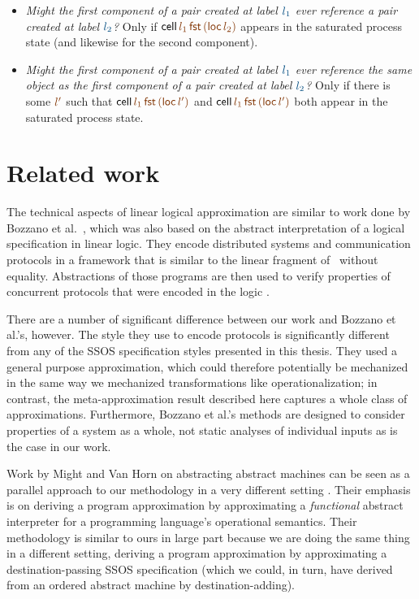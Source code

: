 \smallskip
\begin{itemize}
\item {\it Might the first component of a pair created at label
    $\obj{l_1}$ ever reference a pair created at label $\obj{l_2}$?}
  Only if ${\sf cell}\,\lf{l_1}\,\lf{\sf fst}\,\lf{({\sf loc}\,l_2)}$
  appears in the saturated process state (and likewise for the second
  component).
\item {\it Might the first component of a pair created at label
    $\obj{l_1}$ ever reference the same object as the first component
    of a pair created at label $\obj{l_2}$?} Only if there is some
  $\lf{l'}$ such that ${\sf cell}\,\lf{l_1}\,\lf{\sf fst}\,\lf{({\sf
      loc}\,l')}$ and ${\sf cell}\,\lf{l_1}\,\lf{\sf fst}\,\lf{({\sf
      loc}\,l')}$ both appear in the saturated process state.
\end{itemize}

\section{Related work}
\label{sec:approximately-related}

The technical aspects of linear logical approximation are similar to
work done by Bozzano et al.~\cite{bozzano02effective,bozzano04model},
which was also based on the abstract interpretation of a logical
specification in linear logic.
They encode distributed systems and communication protocols in
a framework that is similar to the linear fragment of \sls~without
equality. Abstractions of those programs are then used to verify
properties of concurrent protocols that were encoded in the logic
\cite{bozzano02protocol}. 

There are a number of significant difference between our work and
Bozzano et al.'s, however. The style they use to encode protocols is
significantly different from any of the SSOS specification styles
presented in this thesis. They used a general purpose approximation,
which could therefore potentially be mechanized in the same way we
mechanized transformations like operationalization; in contrast, the
meta-approximation result described here captures a whole class of
approximations. Furthermore, Bozzano et al.'s methods are designed to
consider properties of a system as a whole, not static analyses of
individual inputs as is the case in our work.

Work by Might and Van Horn on abstracting abstract machines can be
seen as a parallel approach to our methodology in a very different
setting
\cite{might10resolving,might10abstract,might10abstracting}. Their
emphasis is on deriving a program approximation by approximating a
{\it functional} abstract interpreter for a programming language's
operational semantics. Their methodology is similar to ours in large
part because we are doing the same thing in a different setting,
deriving a program approximation by approximating a
destination-passing SSOS specification (which we could, in turn, have
derived from an ordered abstract machine by destination-adding).

